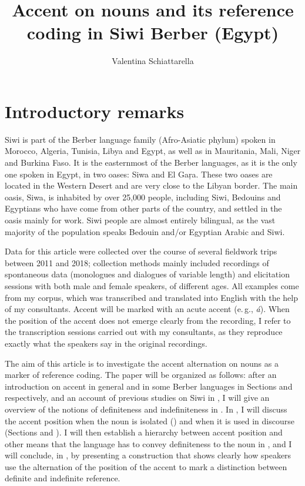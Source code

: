 \documentclass[output=paper]{langsci/langscibook}
\author{Valentina Schiattarella\affiliation{University of Naples, L'Orientale}}
\title{Accent on nouns and its reference coding in Siwi Berber (Egypt)}
\begin{document}
\maketitle


\section{Introductory remarks}\label{5sec:1}

Siwi is part of the Berber language family (Afro-Asiatic phylum) spoken in Morocco, Algeria, Tunisia, Libya and Egypt, as well as in Mauritania, Mali, Niger and Burkina Faso. It is the easternmost of the Berber languages, as it is the only one spoken in Egypt, in two oases: Siwa and El Gaṛa. These two oases are located in the Western Desert and are very close to the Libyan border. The main oasis, Siwa, is inhabited by over 25,000 people, including Siwi, Bedouins and Egyptians who have come from other parts of the country, and settled in the oasis mainly for work. Siwi people are almost entirely bilingual, as the vast majority of the population speaks Bedouin and/or Egyptian Arabic and Siwi. 

Data for this article were collected over the course of several fieldwork trips between 2011 and 2018; collection methods mainly included recordings of spontaneous data (monologues and dialogues of variable length) and elicitation sessions with both male and female speakers, of different ages. All examples come from my corpus, which was transcribed and translated into English with the help of my consultants. Accent will be marked with an acute accent (e.\,g., {\emph{á}}). When the position of the accent does not emerge clearly from the recording, I refer to the transcription sessions carried out with my consultants, as they reproduce exactly what the speakers say in the original recordings.

The aim of this article is to investigate the accent alternation on nouns as a marker of reference coding. The paper will be organized as follows: after an introduction on accent in general and in some Berber languages in Sections  and  respectively, and an account of previous studies on Siwi in , I will give an overview of the notions of definiteness and indefiniteness in . In , I will discuss the accent position when the noun is isolated () and when it is used in discourse (Sections  and ). I will then establish a hierarchy between accent position and other means that the language has to convey definiteness to the noun in , and I will conclude, in , by presenting a construction that shows clearly how speakers use the alternation of the position of the accent to mark a distinction between definite and indefinite reference.
\end{document}
